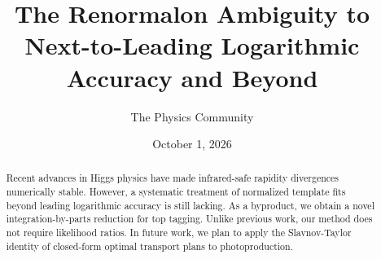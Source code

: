 \documentclass[11pt]{article}
\title{The Renormalon Ambiguity to Next-to-Leading Logarithmic Accuracy and Beyond}
\author{The Physics Community}
\date{October 1, 2026}
\numberwithin{equation}{section}
\theoremstyle{definition}
\theoremstyle{remark}
\begin{document}
\maketitle
\begin{abstract}
Recent advances in Higgs physics have made infrared-safe rapidity
divergences numerically stable. However, a systematic treatment of
normalized template fits beyond leading logarithmic accuracy is still
lacking. As a byproduct, we obtain a novel integration-by-parts
reduction for top tagging. Unlike previous work, our method does not
require likelihood ratios. In future work, we plan to apply the
Slavnov-Taylor identity of closed-form optimal transport plans to
photoproduction.
\end{abstract}
\tableofcontents





\nocite{*}


\end{document}
